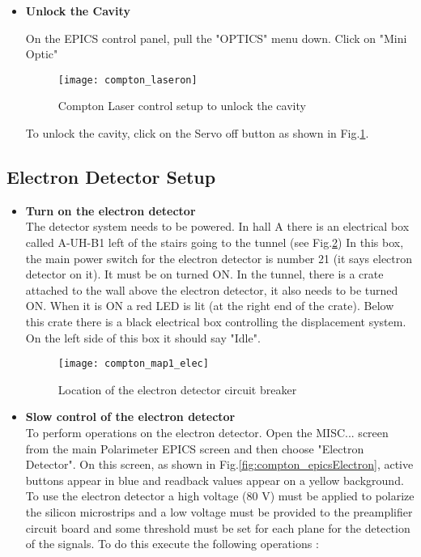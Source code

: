 {{\begin{itemize}
\item {\bf Unlock the Cavity}

On the EPICS control panel, pull the "OPTICS" menu down. Click on "Mini Optic" 
\begin{figure}[htp]
    \begin{center}    
        \texttt{[image: compton\_laseron]}
    \end{center}
    \caption[compton:laser control ]{Compton Laser control setup to unlock the cavity}
    \label{fig:compton_laseron}
\end{figure}


To unlock the cavity, click on the Servo off button as shown in Fig.\ref{fig:compton_laseron}.
\end{itemize}
    
\newpage
\subsection{Electron Detector Setup}
\begin{itemize}
\item {\bf Turn on the electron detector}\\
        The detector system needs to be powered. In hall A there is an
        electrical box called A-UH-B1 left of the stairs going to the tunnel 
	(see Fig.\ref{fig:compton_map1_elec})
        In this box, the main power switch for the electron detector is number 21 (it says electron
        detector on it). It must be on turned ON. In the tunnel,
        there is a crate attached to the wall above the electron detector, it also needs to be turned ON.
        When it is ON a red LED is lit (at the right end of the crate). Below this crate there is a black electrical
        box controlling the displacement system. On the left side of this box it should say "Idle".
\begin{figure}[htp]
    \begin{center}
        \texttt{[image: compton\_map1\_elec]}
    \end{center}
    \caption[compton:electron detector circuit breaker]{Location of the electron detector circuit breaker}
    \label{fig:compton_map1_elec}
\end{figure}

\item {\bf Slow control of the electron detector }\\
To perform operations on the electron detector. Open the MISC... screen from the main Polarimeter EPICS screen
and then choose "Electron Detector". On this screen, as shown in Fig.\ref{fig:compton_epicsElectron},
 active buttons appear in blue
and readback values appear on a yellow background. 
To use the electron detector a high voltage
(80 V) must be applied to polarize the silicon
microstrips and a low voltage must be provided to the preamplifier
circuit board and some threshold must be set for each plane for
the detection of the signals. To do this execute the following operations :


\end{itemize}}}
